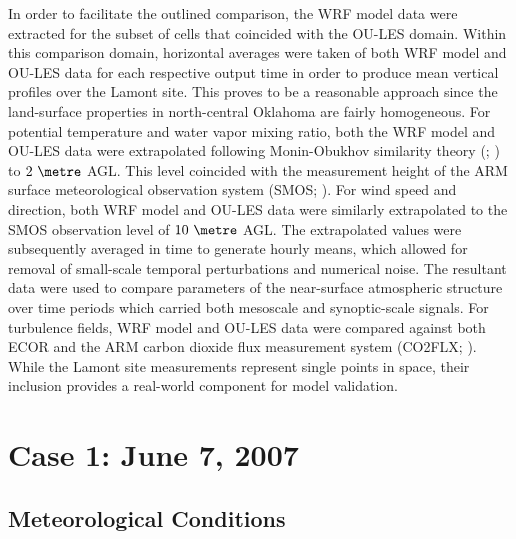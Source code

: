 In order to facilitate the outlined comparison, the WRF model data were extracted for the subset of cells that coincided with the OU-LES domain. Within this comparison domain, horizontal averages were taken of both WRF model and OU-LES data for each respective output time in order to produce mean vertical profiles over the Lamont site. This proves to be a reasonable approach since the land-surface properties in north-central Oklahoma are fairly homogeneous. For potential temperature and water vapor mixing ratio, both the WRF model and OU-LES data were extrapolated following Monin-Obukhov similarity theory (\citealt{MO}; \citealt{Dyer}) to $2  \mbox { }\metre$ AGL. This level coincided with the measurement height of the ARM surface meteorological observation system (SMOS; \citealt{armSMOS}). For wind speed and direction, both WRF model and OU-LES data were similarly extrapolated to the SMOS observation level of $10 \mbox{ }\metre$ AGL. The extrapolated values were subsequently averaged in time to generate hourly means, which allowed for removal of small-scale temporal perturbations and numerical noise. The resultant data were used to compare parameters of the near-surface atmospheric structure over time periods which carried both mesoscale and synoptic-scale signals. For turbulence fields, WRF model and OU-LES data were compared against both ECOR and the ARM carbon dioxide flux measurement system (CO2FLX; \citealt{armCO2FLUX}). While the Lamont site measurements represent single points in space, their inclusion provides a real-world component for model validation. 

\section{Case 1: June 7, 2007}
\label{june7-43}

\subsection{Meteorological Conditions}
\label{mc-431}


